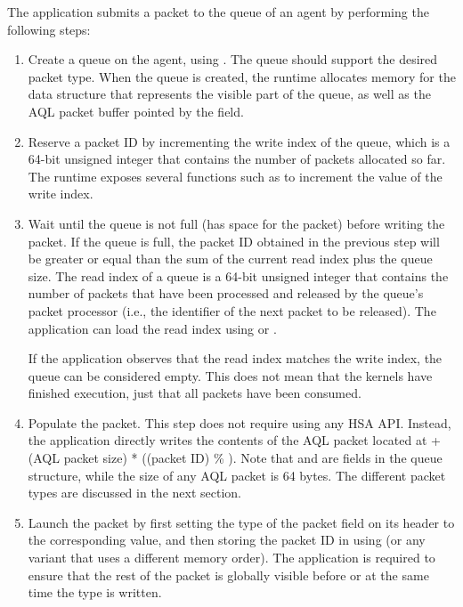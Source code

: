 \documentclass[final,oneside]{book}
\begin{document}
The application submits a packet to the queue of an agent by performing the
following steps:
\begin{enumerate}[itemsep=1pt,topsep=3pt,partopsep=0pt]

\item Create a queue on the agent, using . The queue
  should support the desired packet type. When the queue is created, the runtime
  allocates memory for the  data structure that represents
  the visible part of the queue, as well as the AQL packet buffer pointed by the
   field.

\item Reserve a packet ID by incrementing the write index of the queue, which is
  a 64-bit unsigned integer that contains the number of packets allocated so
  far. The runtime exposes several functions such as
   to increment the value of the write
  index.

\item Wait until the queue is not full (has space for the packet) before writing
the packet. If the queue is full, the packet ID obtained in the previous step
will be greater or equal than the sum of the current read index plus the queue
size. The read index of a queue is a 64-bit unsigned integer that contains the
number of packets that have been processed and released by the queue's packet
processor (i.e., the identifier of the next packet to be released). The
application can load the read index using
 or
.

  If the application observes that the read index matches the write index, the
  queue can be considered empty. This does not mean that the kernels have
  finished execution, just that all packets have been consumed.

\item Populate the packet. This step does not require using any HSA
  API. Instead, the application directly writes the contents of the AQL packet
  located at  + (AQL packet size) * ((packet
  ID) \% ). Note that 
  and  are fields in the queue structure, while the
  size of any AQL packet is 64 bytes. The different packet types are discussed
  in the next section.

\item Launch the packet by first setting the type of the packet field on its
  header to the corresponding value, and then storing the packet ID in
   using 
  (or any variant that uses a different memory order). The application is
  required to ensure that the rest of the packet is globally visible before or
  at the same time the type is written.


\end{enumerate}
\end{document}
